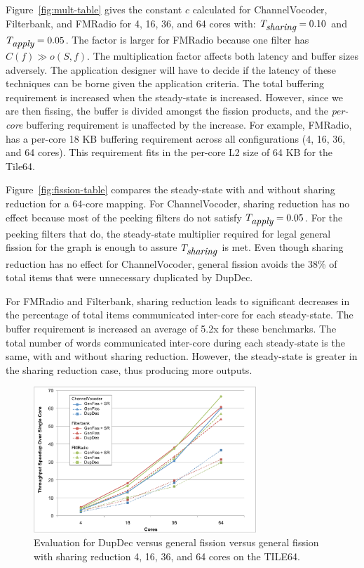 Figure~\ref{fig:mult-table} gives the constant $c$
calculated for ChannelVocoder, Filterbank, and FMRadio for 4, 16, 36,
and 64 cores with: $T_{\mbox{\it sharing}} = 0.10$ and $T_{\mbox{\it apply}} =
0.05$.  The factor is larger for FMRadio because one filter
has $C(f) \gg o(S, f)$.  The multiplication factor affects both
latency and buffer sizes adversely.  The application designer will
have to decide if the latency of these techniques can be borne given
the application criteria.  The total buffering requirement is
increased when the steady-state is increased.  However, since we are
then fissing, the buffer is divided amongst the fission products, and
the {\it per-core} buffering requirement is unaffected by the
increase.  For example, FMRadio, has a per-core 18 KB buffering
requirement across all configurations (4, 16, 36, and 64 cores).  This
requirement fits in the per-core L2 size of 64 KB for the Tile64.

Figure~\ref{fig:fission-table} compares the steady-state with and
without sharing reduction for a 64-core mapping.  For ChannelVocoder,
sharing reduction has no effect because most of the peeking filters do
not satisfy $T_{\mbox{\it apply}} = 0.05$.  For the peeking filters that do,
the steady-state multiplier required for legal general fission for the
graph is enough to assure $T_{\mbox{\it sharing}}$ is met.  Even though
sharing reduction has no effect for ChannelVocoder, general fission
avoids the 38\% of total items that were unnecessary duplicated by
DupDec.

For FMRadio and Filterbank, sharing reduction leads to significant
decreases in the percentage of total items communicated inter-core for
each steady-state.  The buffer requirement is increased an average of
5.2x for these benchmarks.  The total number of words communicated
inter-core during each steady-state is the same, with and without
sharing reduction.  However, the steady-state is greater in the
sharing reduction case, thus producing more outputs.

\begin{figure}[t]
\centering
\includegraphics[width=3.3in]{figures/tilera-chart.pdf}
\caption[Comparing the fission techniques on the TILE64.]{
  Evaluation for DupDec versus general fission versus general fission with sharing reduction
  4, 16, 36, and 64 cores on the TILE64.  \label{fig:tilera-chart}}
\end{figure}

